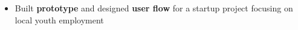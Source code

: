 \vspace{-2mm}
\begin{itemize}
\item Built \textbf{prototype} and designed \textbf{user flow} for a startup project focusing on local youth employment

\end{itemize}



\medskip


